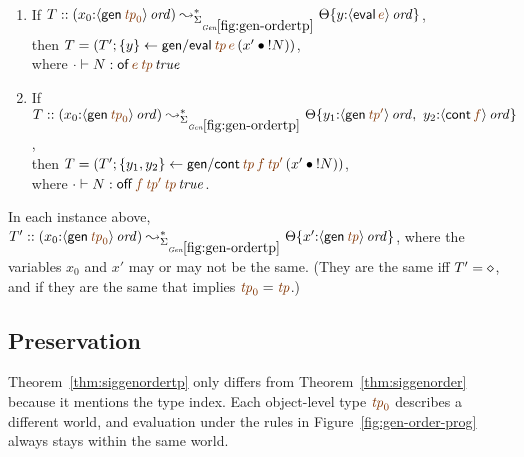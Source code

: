 \bigskip
\begin{lemma}~
\begin{enumerate}
\item If 
   $T :: (x_0{:}\istrue{\susp{{\sf gen}\,\lf{{\it tp}_0}}}) 
         \leadsto^*_{\siggenordertp}
         \tackon{\Theta}{y{:}\istrue{\susp{{\sf eval}\,\lf{e}}}}$,
\\ then 
   $T = \left(T'; \trstep{y}{{\sf gen/eval}\,\lf{{\it tp}}\,\lf{e}\,(\tfuser{x'}{\tbangr{N}})}\right)$,
\\ where $\cdot \vdash N : \isconc{{\sf of}\,\lf{e}\,\lf{{\it tp}}}$
\medskip
\item If 
   $T :: (x_0{:}\istrue{\susp{{\sf gen}\,\lf{{\it tp}_0}}})
         \leadsto^*_{\siggenordertp}
         \tackon{\Theta}{y_1{:}\istrue{\susp{{\sf gen}\,\lf{{\it tp}'}}}, ~
                         y_2{:}\istrue{\susp{{\sf cont}\,\lf{f}}}}$,
\\ then 
   $T = \left(T'; \trstep{y_1,y_2}{{\sf gen/cont}\,\lf{{\it tp}}\,\lf{f}\,\lf{{\it tp}'}\,(\tfuser{x'}{\tbangr{N}})}\right)$,
\\ where 
   $\cdot \vdash N : \isconc{{{{\sf off}\,\lf{f}\,\lf{{\it tp}'}\,\lf{{\it tp}}}}}$.
\medskip
\end{enumerate}
In each instance above, 
$T' :: (x_0{:}\istrue{\susp{{\sf gen}\,\lf{{\it tp}_0}}}) \leadsto^*_{\siggenordertp}
          \tackon{\Theta}{x'{:}\istrue{\susp{{\sf gen}\,\lf{{\it tp}}}}}$,
where the variables $x_0$ and $x'$ may or may not
be the same. (They are the same iff $T' = \diamond$, and if they
are the same that implies $\lf{{\it tp}_0} = \lf{{\it tp}}$.)
\end{lemma}
\bigskip



\subsection{Preservation}


Theorem~\ref{thm:siggenordertp} only differs from
Theorem~\ref{thm:siggenorder} because it mentions the type index.
Each object-level type $\lf{{\it tp}_0}$ describes a different world,
and evaluation under the rules in Figure~\ref{fig:gen-order-prog}
always stays within the same world.

